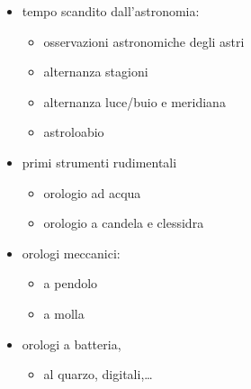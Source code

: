 \documentclass[letterpaper,10pt,italian]{jupyterBook}
\begin{document}
\sphinxAtStartPar
{}

\sphinxAtStartPar
{}
\begin{itemize}
\item {} 
\sphinxAtStartPar
tempo scandito dall’astronomia:
\begin{itemize}
\item {} 
\sphinxAtStartPar
osservazioni astronomiche degli astri

\item {} 
\sphinxAtStartPar
alternanza stagioni

\item {} 
\sphinxAtStartPar
alternanza luce/buio e meridiana

\item {} 
\sphinxAtStartPar
astroloabio

\end{itemize}

\item {} 
\sphinxAtStartPar
primi strumenti rudimentali
\begin{itemize}
\item {} 
\sphinxAtStartPar
orologio ad acqua

\item {} 
\sphinxAtStartPar
orologio a candela e clessidra

\end{itemize}

\item {} 
\sphinxAtStartPar
orologi meccanici:
\begin{itemize}
\item {} 
\sphinxAtStartPar
a pendolo

\item {} 
\sphinxAtStartPar
a molla

\end{itemize}

\item {} 
\sphinxAtStartPar
orologi a batteria,
\begin{itemize}
\item {} 
\sphinxAtStartPar
al quarzo, digitali,…

\end{itemize}

\end{itemize}
\end{document}
